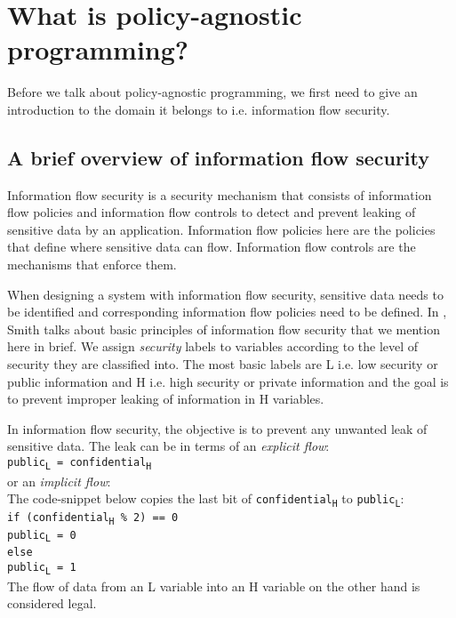 \chapter{What is policy-agnostic programming?\label{chap:PAP}}

Before we talk about policy-agnostic programming, we first need to give an
introduction to the domain it belongs to i.e. information flow security.

\section{A brief overview of information flow security}

Information flow security is a security mechanism that consists of information flow
policies and information flow controls to detect and prevent leaking of sensitive
data by an application. Information flow policies here are the policies that define
where sensitive data can flow. Information flow controls are the mechanisms that
enforce them.

When designing a system with information flow security, sensitive data needs to
be identified and corresponding information flow policies need to be defined. In
\cite{PrincInfoSec}, Smith talks about basic principles of information flow security
that we mention here in brief. We assign \textit{security} labels to variables
according to the level of security they are classified into. The most basic labels
are L i.e. low security or public information and H i.e. high security or private
information and the goal is to prevent improper leaking of information in H variables.

In information flow security, the
objective is to prevent any unwanted leak of sensitive data. The leak can be in
terms of an \textit{explicit flow}: \\ \indent
\texttt{public\textsubscript{L} = confidential\textsubscript{H}} \\
\noindent or an \textit{implicit flow}: \\ The code-snippet below
copies the last bit of \texttt{confidential\textsubscript{H}} to \texttt{public\textsubscript{L}}: \\
\indent
	\texttt{if (confidential\textsubscript{H} \% 2)  == 0 \\ \indent \indent
		public\textsubscript{L} = 0 \\ \indent
	else \\ \indent \indent
		public\textsubscript{L} = 1} \\
The flow of data from an L variable into an H variable on the other hand is considered
legal.


